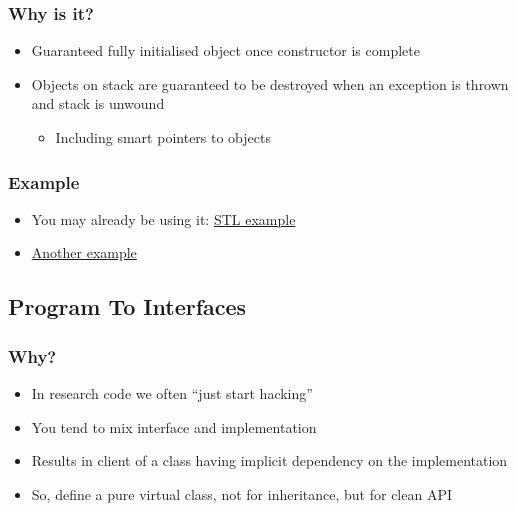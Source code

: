 \subsubsection{Why is it?}\label{why-is-it}

\begin{itemize}
\itemsep1pt\parskip0pt
\item
  Guaranteed fully initialised object once constructor is complete
\item
  Objects on stack are guaranteed to be destroyed when an exception is
  thrown and stack is unwound

  \begin{itemize}
  \itemsep1pt\parskip0pt
  \item
    Including smart pointers to objects
  \end{itemize}
\end{itemize}

\subsubsection{Example}\label{example}

\begin{itemize}
\itemsep1pt\parskip0pt
\item
  You may already be using it:
  \href{https://en.wikipedia.org/wiki/Resource_Acquisition_Is_Initialization}{STL
  example}
\item
  \href{https://en.wikibooks.org/wiki/More_C\%2B\%2B_Idioms/Resource_Acquisition_Is_Initialization}{Another
  example}
\end{itemize}

\subsection{Program To Interfaces}\label{program-to-interfaces}

\subsubsection{Why?}\label{why}

\begin{itemize}
\itemsep1pt\parskip0pt
\item
  In research code we often ``just start hacking''
\item
  You tend to mix interface and implementation
\item
  Results in client of a class having implicit dependency on the
  implementation
\item
  So, define a pure virtual class, not for inheritance, but for clean
  API
\end{itemize}

